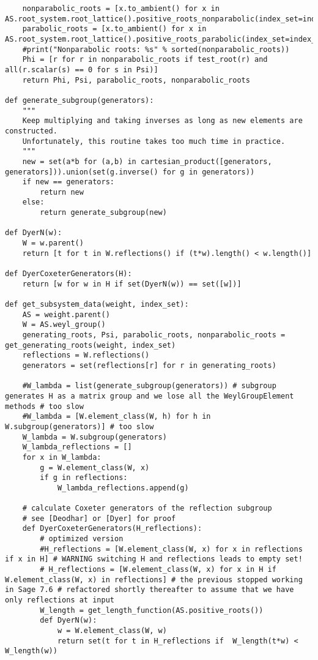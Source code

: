 \begin{verbatim}
    nonparabolic_roots = [x.to_ambient() for x in AS.root_system.root_lattice().positive_roots_nonparabolic(index_set=index_set)]
    parabolic_roots = [x.to_ambient() for x in AS.root_system.root_lattice().positive_roots_parabolic(index_set=index_set)]
    #print("Nonparabolic roots: %s" % sorted(nonparabolic_roots))
    Phi = [r for r in nonparabolic_roots if test_root(r) and all(r.scalar(s) == 0 for s in Psi)]
    return Phi, Psi, parabolic_roots, nonparabolic_roots

def generate_subgroup(generators):
    """
    Keep multiplying and taking inverses as long as new elements are constructed.
    Unfortunately, this routine takes too much time in practice.
    """
    new = set(a*b for (a,b) in cartesian_product([generators, generators])).union(set(g.inverse() for g in generators))
    if new == generators:
        return new
    else:
        return generate_subgroup(new)

def DyerN(w):
    W = w.parent()
    return [t for t in W.reflections() if (t*w).length() < w.length()]

def DyerCoxeterGenerators(H):
    return [w for w in H if set(DyerN(w)) == set([w])]

def get_subsystem_data(weight, index_set):
    AS = weight.parent()
    W = AS.weyl_group()
    generating_roots, Psi, parabolic_roots, nonparabolic_roots =  get_generating_roots(weight, index_set)
    reflections = W.reflections()
    generators = set(reflections[r] for r in generating_roots)

    #W_lambda = list(generate_subgroup(generators)) # subgroup generates H as a matrix group and we lose all the WeylGroupElement methods # too slow
    #W_lambda = [W.element_class(W, h) for h in W.subgroup(generators)] # too slow
    W_lambda = W.subgroup(generators)
    W_lambda_reflections = []
    for x in W_lambda:
        g = W.element_class(W, x)
        if g in reflections:
            W_lambda_reflections.append(g)

    # calculate Coxeter generators of the reflection subgroup
    # see [Deodhar] or [Dyer] for proof
    def DyerCoxeterGenerators(H_reflections):
        # optimized version
        #H_reflections = [W.element_class(W, x) for x in reflections if x in H] # WARNING switching H and reflections leads to empty set!
        # H_reflections = [W.element_class(W, x) for x in H if W.element_class(W, x) in reflections] # the previous stopped working in Sage 7.6 # refactored shortly thereafter to assume that we have only reflections at input
        W_length = get_length_function(AS.positive_roots())
        def DyerN(w):
            w = W.element_class(W, w)
            return set(t for t in H_reflections if  W_length(t*w) < W_length(w))


\end{verbatim}

